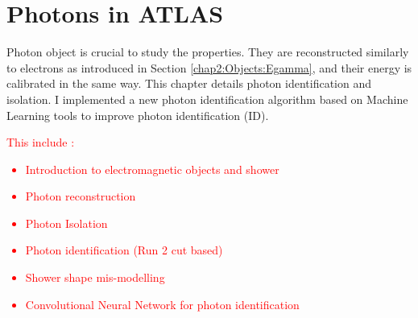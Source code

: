 \newpage
\chapter{Photons in ATLAS}
\label{gamma}
Photon object is crucial to study the \HHyybb properties. They are reconstructed similarly to electrons as introduced in Section \ref{chap2:Objects:Egamma}, and their energy is calibrated in the same way. This chapter details photon identification and isolation. I implemented a new photon identification algorithm based on Machine Learning tools to improve photon identification (ID).  \\
\textcolor{red}{
This include :
\begin{itemize}
    \item Introduction to electromagnetic objects and shower 
    \item Photon reconstruction 
    \item Photon Isolation 
    \item Photon identification (Run 2 cut based)
    \item Shower shape mis-modelling 
    \item Convolutional Neural Network for photon identification
\end{itemize}
}
